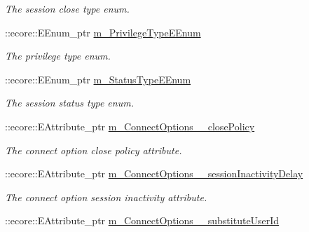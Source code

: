 \begin{DoxyCompactItemize}
\begin{DoxyCompactList}\small\item\em The session close type enum. \item\end{DoxyCompactList}\item 
\hypertarget{classUMS__Data_1_1UMS__DataPackage_a0e7710033cb4a83a89a0fabf67dac8bd}{
::ecore::EEnum\_\-ptr \hyperlink{classUMS__Data_1_1UMS__DataPackage_a0e7710033cb4a83a89a0fabf67dac8bd}{m\_\-PrivilegeTypeEEnum}}
\label{classUMS__Data_1_1UMS__DataPackage_a0e7710033cb4a83a89a0fabf67dac8bd}

\begin{DoxyCompactList}\small\item\em The privilege type enum. \item\end{DoxyCompactList}\item 
\hypertarget{classUMS__Data_1_1UMS__DataPackage_a01b1d1193ada13b7230cccb6c42acf21}{
::ecore::EEnum\_\-ptr \hyperlink{classUMS__Data_1_1UMS__DataPackage_a01b1d1193ada13b7230cccb6c42acf21}{m\_\-StatusTypeEEnum}}
\label{classUMS__Data_1_1UMS__DataPackage_a01b1d1193ada13b7230cccb6c42acf21}

\begin{DoxyCompactList}\small\item\em The session status type enum. \item\end{DoxyCompactList}\item 
\hypertarget{classUMS__Data_1_1UMS__DataPackage_a02a303b044715885d3497cf4530a9475}{
::ecore::EAttribute\_\-ptr \hyperlink{classUMS__Data_1_1UMS__DataPackage_a02a303b044715885d3497cf4530a9475}{m\_\-ConnectOptions\_\-\_\-closePolicy}}
\label{classUMS__Data_1_1UMS__DataPackage_a02a303b044715885d3497cf4530a9475}

\begin{DoxyCompactList}\small\item\em The connect option close policy attribute. \item\end{DoxyCompactList}\item 
\hypertarget{classUMS__Data_1_1UMS__DataPackage_a9d225117caab495518e6e515c9f2cc97}{
::ecore::EAttribute\_\-ptr \hyperlink{classUMS__Data_1_1UMS__DataPackage_a9d225117caab495518e6e515c9f2cc97}{m\_\-ConnectOptions\_\-\_\-sessionInactivityDelay}}
\label{classUMS__Data_1_1UMS__DataPackage_a9d225117caab495518e6e515c9f2cc97}

\begin{DoxyCompactList}\small\item\em The connect option session inactivity attribute. \item\end{DoxyCompactList}\item 
\hypertarget{classUMS__Data_1_1UMS__DataPackage_a3bc3f7f17e0372a8491c73ea45335147}{
::ecore::EAttribute\_\-ptr \hyperlink{classUMS__Data_1_1UMS__DataPackage_a3bc3f7f17e0372a8491c73ea45335147}{m\_\-ConnectOptions\_\-\_\-substituteUserId}}
\label{classUMS__Data_1_1UMS__DataPackage_a3bc3f7f17e0372a8491c73ea45335147}


\end{DoxyCompactItemize}
